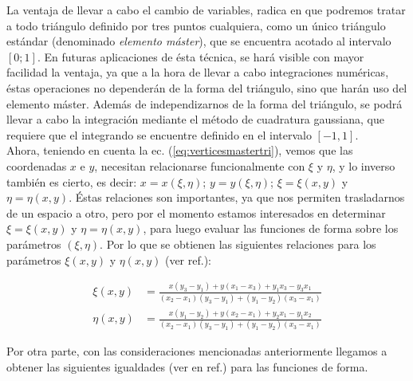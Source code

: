 La ventaja de llevar a cabo el cambio de variables, radica en que podremos tratar a todo triángulo definido por tres puntos cualquiera, como un único triángulo estándar (denominado \emph{elemento máster}), que se encuentra acotado al intervalo $ [0; 1] $. En futuras aplicaciones de ésta técnica, se hará visible con mayor facilidad la ventaja, ya que a la hora de llevar a cabo integraciones numéricas, éstas operaciones no dependerán de la forma del triángulo, sino que harán uso del elemento máster. Además de independizarnos de la forma del triángulo, se podrá llevar a cabo la integración mediante el método de cuadratura gaussiana, que requiere que el integrando se encuentre definido en el intervalo $[-1,1]$.
\\
Ahora, teniendo en cuenta la ec. (\ref{eq:verticesmastertri}), vemos que las coordenadas $x$ e $y$, necesitan relacionarse funcionalmente con  $\xi$ y $\eta$, y lo inverso también es cierto, es decir: $x=x( \xi, \eta)$; $y=y( \xi, \eta)$; $\xi= \xi(x,y)$ y $\eta= \eta(x,y)$. Éstas relaciones son importantes, ya que nos permiten trasladarnos de un espacio a otro, pero por el momento estamos interesados en determinar $\xi= \xi(x,y)$ y $\eta= \eta(x,y)$, para luego evaluar las funciones de forma sobre los parámetros $(\xi, \eta)$. Por lo que se obtienen las siguientes relaciones para los parámetros $\xi(x,y)$ y $\eta(x,y)$ (ver ref.\cite{Hal}):
 
\begin{equation}
  \label{eq:chietadexy}
  \begin{split}
    \xi(x,y) & =
    \frac{x(y_3-y_1)+y(x_1-x_3)+y_1x_3-y_3x_1}{(x_2-x_1)(y_3-y_1)+(y_1-y_2)(x_3-x_1)} \\
    \eta(x,y) & =
    \frac{x(y_1-y_2)+y(x_2-x_1)+y_2x_1-y_1x_2}{(x_2-x_1)(y_3-y_1)+(y_1-y_2)(x_3-x_1)}
  \end{split}
\end{equation}

Por otra parte, con las consideraciones mencionadas anteriormente llegamos a obtener las siguientes igualdades (ver en ref.\cite{Hirsch}) para las funciones de forma.

